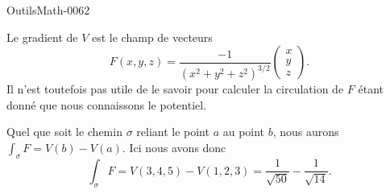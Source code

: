 
\begin{corrige}{OutilsMath-0062}

    Le gradient de $V$ est le champ de vecteurs
    \begin{equation}
        F(x,y,z)=\frac{-1}{ (x^2+y^2+z^2)^{3/2} }\begin{pmatrix}
            x    \\ 
            y    \\ 
            z    
        \end{pmatrix}.
    \end{equation}
    Il n'est toutefois pas utile de le savoir pour calculer la circulation de $F$ étant donné que nous connaissons le potentiel.

    Quel que soit le chemin $\sigma$ reliant le point $a$ au point $b$, nous aurons $\int_{\sigma}F=V(b)-V(a)$. Ici nous avons donc
    \begin{equation}
        \int_{\sigma}F=V(3,4,5)-V(1,2,3)=\frac{1}{ \sqrt{50} }-\frac{1}{ \sqrt{14} }.
    \end{equation}

\end{corrige}
